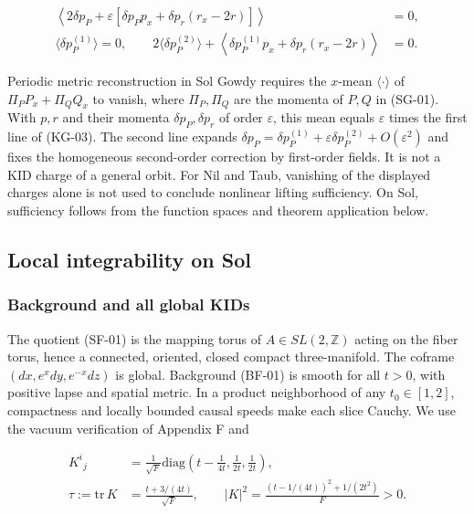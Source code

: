 \begin{equation}\tag{KG-03}\label{eq:KG-03}
\begin{aligned}
\left\langle2\delta p_P+\varepsilon\left[\delta p_P p_x+\delta p_r(r_x-2r)\right]\right\rangle&=0,\\
\langle\delta p_P^{(1)}\rangle=0,\qquad
2\langle\delta p_P^{(2)}\rangle+\left\langle\delta p_P^{(1)}p_x+\delta p_r(r_x-2r)\right\rangle&=0.
\end{aligned}
\end{equation}

Periodic metric reconstruction in Sol Gowdy requires the $x$-mean $\langle\cdot\rangle$ of $\Pi_PP_x+\Pi_QQ_x$ to vanish, where $\Pi_P,\Pi_Q$ are the momenta of $P,Q$ in (SG-01). With $p,r$ and their momenta $\delta p_P,\delta p_r$ of order $\varepsilon$, this mean equals $\varepsilon$ times the first line of (KG-03). The second line expands $\delta p_P=\delta p_P^{(1)}+\varepsilon\delta p_P^{(2)}+O(\varepsilon^2)$ and fixes the homogeneous second-order correction by first-order fields. It is not a KID charge of a general orbit. For Nil and Taub, vanishing of the displayed charges alone is not used to conclude nonlinear lifting sufficiency. On Sol, sufficiency follows from the function spaces and theorem application below.

\subsection{Local integrability on Sol}

\subsubsection{Background and all global KIDs}
The quotient (SF-01) is the mapping torus of $A\in SL(2,\mathbb Z)$ acting on the fiber torus, hence a connected, oriented, closed compact three-manifold. The coframe $(dx,e^xdy,e^{-x}dz)$ is global. Background (BF-01) is smooth for all $t>0$, with positive lapse and spatial metric. In a product neighborhood of any $t_0\in[1,2]$, compactness and locally bounded causal speeds make each slice Cauchy. We use the vacuum verification of Appendix F and

\begin{equation}\tag{SL-02}\label{eq:SL-02}
\begin{aligned}
K^i{}_j&=\frac1{\sqrt F}\mathrm{diag}
\left(t-\frac1{4t},\frac1{2t},\frac1{2t}\right),\\
\tau:=\mathrm{tr}\,K&=\frac{t+3/(4t)}{\sqrt F},\qquad
|K|^2=\frac{(t-1/(4t))^2+1/(2t^2)}F>0.
\end{aligned}
\end{equation}

